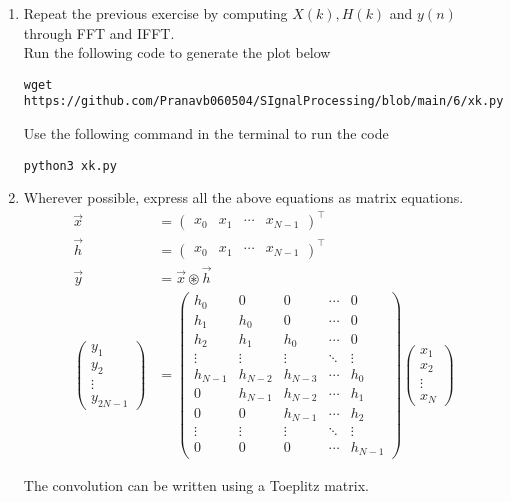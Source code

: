 \documentclass[journal,12pt,twocolumn]{IEEEtran}
\newcommand{\myvec}[1]{\ensuremath{\begin{pmatrix}#1\end{pmatrix}}}
\renewcommand\thesection{\arabic{section}}
\begin{document}
\begin{enumerate}[label=\thesection.\arabic*]
\item Repeat the previous exercise by computing $X(k), H(k)$ and $y(n)$ through FFT and 
IFFT.\\
\solution 
Run the following code to generate the plot below
\begin{lstlisting}
wget https://github.com/Pranavb060504/SIgnalProcessing/blob/main/6/xk.py
\end{lstlisting}
Use the following command in the terminal to run the code
\begin{lstlisting}
python3 xk.py
\end{lstlisting}
\item Wherever possible, express all the above equations as matrix equations.
\\
\solution 
\begin{align}
		\vec{x} &= \myvec{x_0 & x_1	 & \cdots & x_{N-1}}^\top \\
		\vec{h} &= \myvec{x_0 & x_1	 & \cdots & x_{N-1}}^\top \\
		\vec{y} &= \vec{x} \circledast \vec{h} \\
		\myvec{y_1 \\ y_2 \\ \vdots \\ y_{2N - 1}} &= \myvec{
			h_0 & 0 & 0 & \cdots & 0 \\
			h_1 & h_0 & 0 & \cdots & 0 \\
			h_2 & h_1 & h_0 & \cdots & 0 \\
			\vdots & \vdots & \vdots & \ddots & \vdots \\
			h_{N-1} & h_{N-2} & h_{N-3} & \cdots & h_0 \\
			0 & h_{N-1} & h_{N-2} & \cdots & h_1 \\
			0 & 0 & h_{N-1} & \cdots & h_2 \\
			\vdots & \vdots & \vdots & \ddots & \vdots \\
			0 & 0 & 0 & \cdots & h_{N-1}
		}		
		\myvec{x_1\\x_2\\ \vdots \\x_N}
	\end{align}
	
	The convolution can be written using a Toeplitz matrix. 
	

\end{enumerate}
\end{document}
